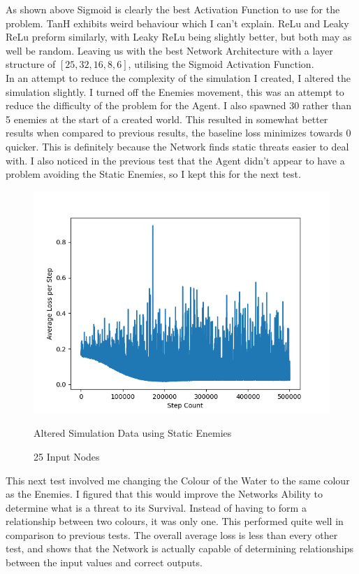 \begin{flushleft}
        As shown above Sigmoid is clearly the best Activation Function to use for the problem. TanH exhibits weird behaviour which I can't explain. 
        ReLu and Leaky ReLu preform similarly, with Leaky ReLu being slightly better, but both may as well be random. Leaving us with the best Network 
        Architecture with a layer structure of $[25,32,16,8,6]$, utilising the Sigmoid Activation Function. \\
        \vspace{0.2cm}
        In an attempt to reduce the complexity of the simulation I created, I altered the simulation slightly. I turned off the Enemies movement,
        this was an attempt to reduce the difficulty of the problem for the Agent. I also spawned 30 rather than 5 enemies at the start of a created
        world. This resulted in somewhat better results when compared to previous results, the baseline loss minimizes towards 0 quicker. This is 
        definitely because the Network finds static threats easier to deal with. I also noticed in the previous test that the Agent didn't appear 
        to have a problem avoiding the Static Enemies, so I kept this for the next test.

        \begin{figure}[H]
            \centering
            \includegraphics[width=12cm]{Images/Evaluation/StaticEnemiesExtra.png}
            \caption*{Altered Simulation Data using Static Enemies}
            \caption*{25 Input Nodes}
        \end{figure}

        This next test involved me changing the Colour of the Water to the same colour as the Enemies. I figured that this would improve the Networks
        Ability to determine what is a threat to its Survival. Instead of having to form a relationship between two colours, it was only one. This
        performed quite well in comparison to previous tests. The overall average loss is less than every other test, and shows that the Network is 
        actually capable of determining relationships between the input values and correct outputs.


\end{flushleft}
